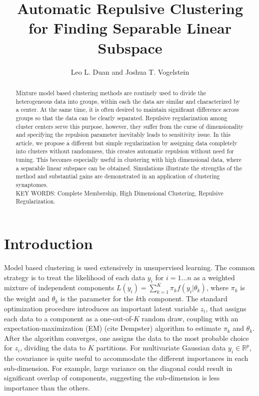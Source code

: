\documentclass[12pt]{article}
\title
    {Automatic Repulsive Clustering \\for Finding Separable Linear Subspace}
\author{
     Leo L. Duan and
     Joshua T. Vogelstein
}
\date{}
\newcommand{\bb}[1]{\mathbb{#1}}
\begin{document}
    
\maketitle

\begin{abstract}
Mixture model based clustering methods are routinely used to divide the heterogeneous data into groups, within each the data are similar and characterized by a center. At the same time, it is often desired to maintain significant difference across groups so that the data can be clearly separated. Repulsive regularization among cluster centers serve this purpose, however, they suffer from the curse of dimensionality and specifying the repulsion parameter inevitably leads to sensitivity issue. In this article, we propose a different but simple regularization by assigning data completely into clusters without randomness, this creates automatic repulsion without need for tuning. This becomes especially useful in clustering with high dimensional data, where a separable linear subspace can be obtained. Simulations illustrate the strengths of the method and substantial gains are demonstrated in an application of clustering synaptomes.\\
{\noindent  KEY WORDS:  Complete Membership, High Dimensional Clustering, Repulsive Regularization.}
\end{abstract}

\section{Introduction}

Model based clustering \citep{fraley2002model} is used extensively in unsupervised learning. The common strategy is to treat the likelihood of each data $y_i$ for $i=1\ldots n$ as a weighted mixture of independent components $L(y_i)=\sum_{k=1}^{K} \pi_k f(y_i|\theta_k)$, where $\pi_k$ is the weight and $\theta_k$ is the parameter for the $k$th component. The standard optimization procedure introduces an important latent variable $z_i$, that assigns each data to a component as a one-out-of-$K$ random draw, coupling with an expectation-maximization (EM) (cite Dempster) algorithm to estimate $\pi_k$ and $\theta_k$. After the algorithm converges, one assigns the data to the most probable choice for $z_i$, dividing the data to $K$ partitions. For multivariate Gaussian data $y_i \in \bb R^p$, the covariance is quite useful to accommodate the different importances in each sub-dimension. For example, large variance on the diagonal could result in significant overlap of components, suggesting the sub-dimension is less importance than the others.
\end{document}
